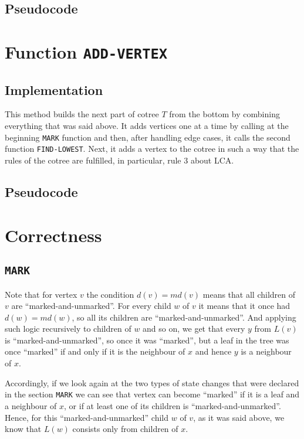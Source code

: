 \subsection{Pseudocode}



\section{Function \texttt{ADD-VERTEX}}
\subsection{Implementation}
This method builds the next part of cotree $T$ from the bottom by combining everything that was said above. It adds vertices one at a time by calling at the beginning \texttt{MARK} function and then, after handling edge cases, it calls the second function \texttt{FIND-LOWEST}. Next, it adds a vertex to the cotree in such a way that the rules of the cotree are fulfilled, in particular, rule 3 about LCA. 

\subsection{Pseudocode}


\label{Correnctness}
\section{Correctness}
\subsection{\texttt{MARK}}

Note that for vertex $v$ the condition $d(v) = md(v)$ means that all children of $v$ are ``marked-and-unmarked''. For every child $w$ of $v$ it means that it once had $d(w) = md(w)$, so all its children are ``marked-and-unmarked''. And applying such logic recursively to children of $w$ and so on, we get that every $y$ from $L(v)$ is ``marked-and-unmarked'', so once it was ``marked'', but a leaf in the tree was once ``marked'' if and only if it is the neighbour of $x$ and hence $y$ is a neighbour of $x$. 

Accordingly, if we look again at the two types of state changes that were declared in the section \texttt{MARK} we can see that vertex can become ``marked'' if it is a leaf and a neighbour of $x$, or if at least one of its children is ``marked-and-unmarked''. Hence, for this ``marked-and-unmarked'' child $w$ of $v$, as it was said above, we know that $L(w)$ consists only from children of $x$.

